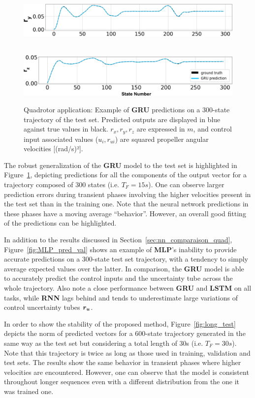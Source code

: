 \begin{figure}[h!]
\begin{minipage}{0.49\linewidth}
        \includegraphics[width=\linewidth]{figures/learning_quadrotor/pred_ry.jpg}
    \end{minipage}\\
    \includegraphics[width=0.49\linewidth]{figures/learning_quadrotor/pred_rz.jpg}
    \caption{Quadrotor application: Example of \textbf{GRU} predictions on a 300-state trajectory of the test set. 
    Predicted outputs are displayed in blue against true values in black. $r_{x}, r_{y}, r_{z}$ are expressed in $m$, and control input associated values ($u_{i},r_{ui}$) are squared propeller angular velocities [(rad/s)²].}
    \label{fig:pred_test}
\end{figure}

The robust generalization of the \textbf{GRU} model to the test set is highlighted in Figure~\ref{fig:pred_test}, depicting predictions for all the components of the output vector for a trajectory composed of 300 states (i.e. $T_F=15s$).
One can observe larger prediction errors during transient phases involving the higher velocities present in the test set than in the training one.
Note that the neural network predictions in these phases have a moving average ``behavior''. 
However, an overall good fitting of the predictions can be highlighted.

In addition to the results discussed in Section~\ref{sec:nn_comparaison_quad}, Figure~\ref{fig:MLP_pred_val} shows an example of \textbf{MLP}'s inability to provide accurate predictions on a 300-state test set trajectory, with a tendency to simply average expected values over the latter.
In comparison, the \textbf{GRU} model is able to accurately predict the control inputs and the uncertainty tube across the whole trajectory. 
Also note a close performance between \textbf{GRU} and \textbf{LSTM} on all tasks, while \textbf{RNN} lags behind and tends to underestimate large variations of control uncertainty tubes $\boldsymbol{r_u}$.

In order to show the stability of the proposed method, Figure~\ref{fig:long_test} depicts the norm of predicted vectors for a 600-state trajectory generated in the same way as the test set but considering a total length of 30s (i.e. $T_F=30s$).
Note that this trajectory is twice as long as those used in training, validation and test sets.
The results show the same behavior in transient phases where higher velocities are encountered.
However, one can observe that the model is consistent throughout longer sequences even with a different distribution from the one it was trained one. 

